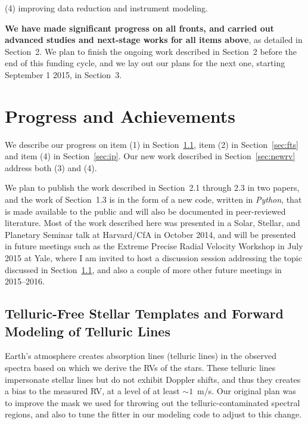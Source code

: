 \documentclass[12pt]{article}
\def\mps{m/s}
\begin{document}
(4) improving data reduction and instrument modeling.

{\bf We have made significant progress on all fronts, and carried out
  advanced studies and next-stage works for all items above}, as
detailed in Section~2. We plan to finish the ongoing work
described in Section~2 before the end of this funding cycle, and we
lay out our plans for the next one, starting September 1 2015, in
Section~3.


\vspace{-10pt}
\section{Progress and Achievements}
\vspace{-5pt}

We describe our progress on item (1) in Section~\ref{sec:tell}, item
(2) in Section~\ref{sec:fts} and item (4) in Section~\ref{sec:ip}. Our
new work described in Section~\ref{sec:newrv} address both (3) and
(4).

We plan to publish the work described in Section~2.1 through 2.3 in
two papers, and the work of Section~1.3 is in the form of a new code,
written in {\it Python}, that is made available to the public and will
also be documented in peer-reviewed literature. Most of the work
described here was presented in a Solar, Stellar, and Planetary
Seminar talk at Harvard/CfA in October 2014, and will be presented in
future meetings such as the Extreme Precise Radial Velocity Workshop
in July 2015 at Yale, where I am invited to host a discussion session
addressing the topic discussed in Section~\ref{sec:tell}, and also a
couple of more other future meetings in 2015--2016.


\vspace{-10pt}
\subsection{Telluric-Free Stellar Templates and Forward Modeling of
  Telluric Lines}\label{sec:tell}
\vspace{-5pt}

Earth's atmosphere creates absorption lines (telluric lines) in the
observed spectra based on which we derive the RVs of the stars. These
telluric lines impersonate stellar lines but do not exhibit Doppler
shifts, and thus they creates a bias to the measured RV, at a level of
at least $\sim1$~\mps. Our original plan was to improve the mask we
used for throwing out the telluric-contaminated spectral regions, and also to
tune the fitter in our modeling code to adjust to this change.
\end{document}
